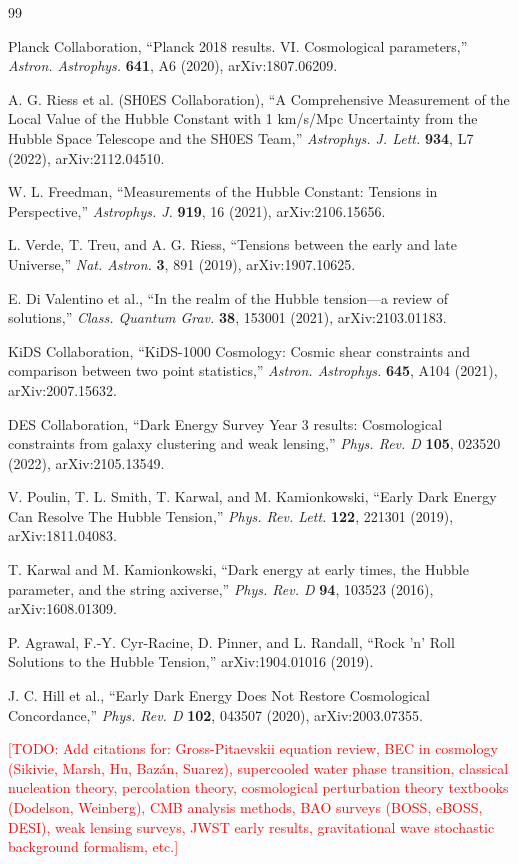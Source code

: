 \documentclass[11pt,a4paper]{article}
\theoremstyle{definition}
\theoremstyle{remark}
\begin{document}
\begin{thebibliography}{99}

Planck Collaboration,
``Planck 2018 results. VI. Cosmological parameters,''
\textit{Astron. Astrophys.} \textbf{641}, A6 (2020),
arXiv:1807.06209.

A. G. Riess et al. (SH0ES Collaboration),
``A Comprehensive Measurement of the Local Value of the Hubble Constant with 1 km/s/Mpc Uncertainty from the Hubble Space Telescope and the SH0ES Team,''
\textit{Astrophys. J. Lett.} \textbf{934}, L7 (2022),
arXiv:2112.04510.

W. L. Freedman,
``Measurements of the Hubble Constant: Tensions in Perspective,''
\textit{Astrophys. J.} \textbf{919}, 16 (2021),
arXiv:2106.15656.

L. Verde, T. Treu, and A. G. Riess,
``Tensions between the early and late Universe,''
\textit{Nat. Astron.} \textbf{3}, 891 (2019),
arXiv:1907.10625.

E. Di Valentino et al.,
``In the realm of the Hubble tension—a review of solutions,''
\textit{Class. Quantum Grav.} \textbf{38}, 153001 (2021),
arXiv:2103.01183.

KiDS Collaboration,
``KiDS-1000 Cosmology: Cosmic shear constraints and comparison between two point statistics,''
\textit{Astron. Astrophys.} \textbf{645}, A104 (2021),
arXiv:2007.15632.

DES Collaboration,
``Dark Energy Survey Year 3 results: Cosmological constraints from galaxy clustering and weak lensing,''
\textit{Phys. Rev. D} \textbf{105}, 023520 (2022),
arXiv:2105.13549.

V. Poulin, T. L. Smith, T. Karwal, and M. Kamionkowski,
``Early Dark Energy Can Resolve The Hubble Tension,''
\textit{Phys. Rev. Lett.} \textbf{122}, 221301 (2019),
arXiv:1811.04083.

T. Karwal and M. Kamionkowski,
``Dark energy at early times, the Hubble parameter, and the string axiverse,''
\textit{Phys. Rev. D} \textbf{94}, 103523 (2016),
arXiv:1608.01309.

P. Agrawal, F.-Y. Cyr-Racine, D. Pinner, and L. Randall,
``Rock 'n' Roll Solutions to the Hubble Tension,''
arXiv:1904.01016 (2019).

J. C. Hill et al.,
``Early Dark Energy Does Not Restore Cosmological Concordance,''
\textit{Phys. Rev. D} \textbf{102}, 043507 (2020),
arXiv:2003.07355.

\textcolor{red}{[TODO: Add citations for: Gross-Pitaevskii equation review, BEC in cosmology (Sikivie, Marsh, Hu, Baz\'an, Suarez), supercooled water phase transition, classical nucleation theory, percolation theory, cosmological perturbation theory textbooks (Dodelson, Weinberg), CMB analysis methods, BAO surveys (BOSS, eBOSS, DESI), weak lensing surveys, JWST early results, gravitational wave stochastic background formalism, etc.]}

\end{thebibliography}
\end{document}
